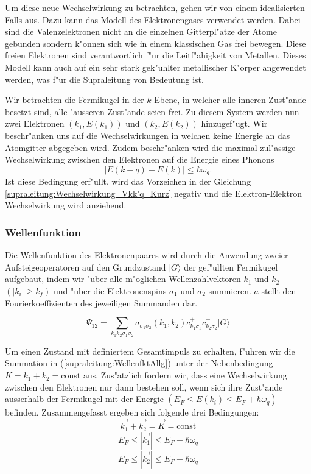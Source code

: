 \begin{refsection}
Um diese neue Wechselwirkung zu betrachten, gehen wir von einem idealisierten Falls aus.
Dazu kann das Modell des Elektronengases verwendet werden.
Dabei sind die Valenzelektronen nicht an die einzelnen Gitterpl"atze der Atome gebunden sondern
k"onnen sich wie in einem klassischen Gas frei bewegen.
Diese freien Elektronen sind verantwortlich f"ur die Leitf"ahigkeit von Metallen.
Dieses Modell kann auch auf ein sehr stark gek"uhlter metallischer K"orper angewendet werden,
was f"ur die Supraleitung von Bedeutung ist.

Wir betrachten die Fermikugel in der $k$-Ebene, in welcher alle inneren Zust"ande besetzt sind,
alle "ausseren Zust"ande seien frei.
Zu diesem System werden nun zwei Elektronen $(k_1,E(k_1))$ und $(k_2,E(k_2))$ hinzugef"ugt.
Wir beschr"anken uns auf die Wechselwirkungen in welchen keine Energie an das Atomgitter abgegeben wird.
Zudem beschr"anken wird die maximal zul"assige Wechselwirkung zwischen den Elektronen auf die
Energie eines Phonons
\begin{equation}
|E(k+q)-E(k)|\le\hbar\omega_q .
\label{supraleitung:Phonon Energie}
\end{equation}
Ist diese Bedingung erf"ullt, wird das Vorzeichen in der Gleichung \ref{supraleitung:Wechselwirkung_Vkk'q_Kurz} negativ und die Elektron-Elektron Wechselwirkung wird anziehend.

\subsubsection{Wellenfunktion}
Die Wellenfunktion des Elektronenpaares wird durch die Anwendung zweier Aufsteigeoperatoren
auf den Grundzustand $|G\rangle$ der gef"ullten Fermikugel aufgebaut, indem wir "uber
alle m"oglichen Wellenzahlvektoren $k_1$ und $k_2$ $(|k_i| \ge k_f)$ und "uber
die Elektronenspins $\sigma_1$ und $\sigma_2$ summieren.
$a$ stellt den Fourierkoeffizienten des jeweiligen Summanden dar.

\begin{equation}
\Psi_{12}=\sum \limits_{k_1k_2\sigma_1\sigma_2} a_{\sigma_1\sigma_2}
(k_1,k_2)c^+_{k_1\sigma_1}c^+_{k_2\sigma_2}|G\rangle
\label{supraleitung:WellenfktAllg}
\end{equation}

Um einen Zustand mit definiertem Gesamtimpuls zu erhalten, f"uhren wir die Summation in
(\ref{supraleitung:WellenfktAllg}) unter der Nebenbedingung $K=k_1+k_2=\text{const}$ aus.
Zus"atzlich fordern wir, dass eine Wechselwirkung zwischen den Elektronen nur dann bestehen soll,
wenn sich ihre Zust"ande ausserhalb der Fermikugel mit der Energie
$(E_F \le E(k_i) \le E_F+\hbar\omega_q)$ befinden.
Zusammengefasst ergeben sich folgende drei Bedingungen:
\[
\overrightarrow{k_1}+\overrightarrow{k_2}=\overrightarrow{K}=\text{const}
\]
\[
E_F\le|\overrightarrow{k_1}|\le E_F+\hbar\omega_q
\]
\[
E_F\le|\overrightarrow{k_2}|\le E_F+\hbar\omega_q
\]

\end{refsection}
